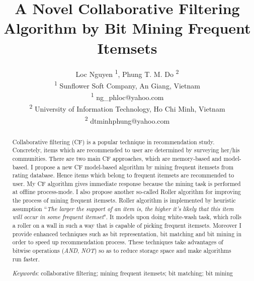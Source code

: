 \documentclass[10pt]{article}
\begin{document}
\title{A Novel Collaborative Filtering Algorithm by Bit Mining Frequent Itemsets}

\author{
Loc Nguyen \textsuperscript{1}, Phung T. M. Do \textsuperscript{2}\\
\textsuperscript{1} Sunflower Soft Company, An Giang, Vietnam\\
\textsuperscript{1} ng\_phloc@yahoo.com\\
\textsuperscript{2} University of Information Technology, Ho Chi Minh, Vietnam\\
\textsuperscript{2} dtminhphung@yahoo.com
}

\maketitle

\begin{abstract}
Collaborative filtering (CF) is a popular technique in recommendation study. Concretely, items which are recommended to user are determined by surveying her/his communities. There are two main CF approaches, which are memory-based and model-based. I propose a new CF model-based algorithm by mining frequent itemsets from rating database. Hence items which belong to frequent itemsets are recommended to user. My CF algorithm gives immediate response because the mining task is performed at offline process-mode. I also propose another so-called Roller algorithm for improving the process of mining frequent itemsets. Roller algorithm is implemented by heuristic assumption ``\textit{The larger the support of an item is, the higher it's likely that this item will occur in some frequent itemset}". It models upon doing white-wash task, which rolls a roller on a wall in such a way that is capable of picking frequent itemsets. Moreover I provide enhanced techniques such as bit representation, bit matching and bit mining in order to speed up recommendation process. These techniques take advantages of bitwise operations (\textit{AND}, \textit{NOT}) so as to reduce storage space and make algorithms run faster.

\textit{Keywords}: collaborative filtering; mining frequent itemsets; bit matching; bit mining
\end{abstract}
\end{document}
